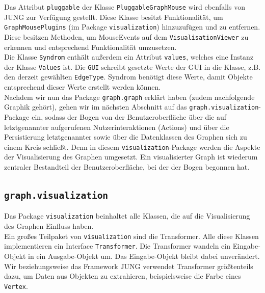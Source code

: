 \documentclass[enabledeprecatedfontcommands,fontsize=11pt,paper=a4,twoside]{scrartcl}
\newcounter{one}
\begin{document}
Das Attribut \texttt{pluggable} der Klasse \texttt{PluggableGraphMouse} wird ebenfalls von JUNG zur Verfügung gestellt. Diese Klasse besitzt Funktionalität, um \texttt{GraphMousePlugins} (im Package \texttt{visualization}) hinzuzufügen und zu entfernen. Diese besitzen Methoden, um MouseEvents auf dem \texttt{VisualisationViewer} zu erkennen und entsprechend Funktionalität umzusetzen. \\

Die Klasse \texttt{Syndrom} enthält außerdem ein Attribut \texttt{values}, welches eine Instanz der Klasse \texttt{Values} ist. Die \texttt{GUI} schreibt gesetzte Werte der GUI in die Klasse, z.B. den derzeit gewählten \texttt{EdgeType}. Syndrom benötigt diese Werte, damit Objekte entsprechend dieser Werte erstellt werden können. \\



Nachdem wir nun das Package \texttt{graph.graph} erklärt haben (zudem nachfolgende Graphik gehört), gehen wir im nächsten Abschnitt auf das \texttt{graph.visualization}-Package ein, sodass der Bogen von der Benutzeroberfläche über die auf letztgenannter aufgerufenen Nutzerinteraktionen (Actions) und über die Persistierung letztgenannter sowie über die Datenklassen des Graphen sich zu einem Kreis schließt. Denn in diesem \texttt{visualization}-Package werden die Aspekte der Visualisierung des Graphen umgesetzt. Ein visualisierter Graph ist wiederum zentraler Bestandteil der Benutzeroberfläche, bei der der Bogen begonnen hat.



\newpage




\subsection{\texttt{graph.visualization}}

Das Package \texttt{visualization} beinhaltet alle Klassen, die auf die Visualisierung des Graphen Einfluss haben. \\

Ein großes Teilpaket von \texttt{visualization} sind die Transformer.  Alle diese Klassen implementieren ein Interface \texttt{Transformer}. Die Transformer wandeln ein Eingabe-Objekt in ein Ausgabe-Objekt um. Das Eingabe-Objekt bleibt dabei unverändert. Wir beziehungsweise das Framework JUNG verwendet Transformer größtenteils dazu, um Daten aus Objekten zu extrahieren, beispielsweise die Farbe eines \texttt{Vertex}. \\
\end{document}
